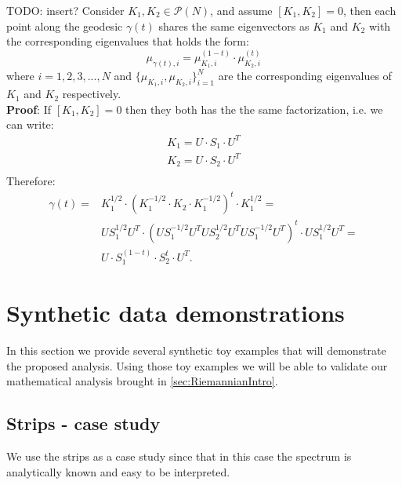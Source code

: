 \documentclass[]{article}
\theoremstyle{definition}
\begin{document}
	
	TODO: insert?
	Consider $K_1,K_2 \in \mathcal{P}(N)$, and assume $[K_1,K_2]=0$, then each point along the geodesic $\gamma(t)$ shares the same eigenvectors as $K_1$ and $K_2$ with the corresponding eigenvalues that holds the form: 
	\begin{equation}
	\mu_{\gamma(t),i} = \mu_{K_1,i}^{(1-t)} \cdot \mu_{K_2,i}^{(t)} 
	\label{eq:CommonEigenVals2}
	\end{equation}
	where $i=1,2,3,...,N$ and $ \{ \mu_{K_1,i}, \mu_{K_2,i} \}_{i=1}^N$ are the corresponding eigenvalues of $K_1$ and $K_2$ respectively.\\
	\textbf{Proof}:
	If $[K_1,K_2]=0$ then they both has the the same factorization, i.e. we can write:
	\begin{eqnarray*}
		K_1 = U\cdot S_1 \cdot U^T \\ 
		K_2 = U\cdot S_2 \cdot U^T \\ 
	\end{eqnarray*}
	Therefore:
	\begin{equation}
	\begin{aligned}
	\gamma(t)= & K_1^{1/2}\cdot( K_1^{-1/2} \cdot K_2 \cdot K_1^{-1/2})^t \cdot K_1^{1/2} =\\
	& U S_1^{1/2}  U^T \cdot(U S_1^{-1/2}  U^T  U S_2^{1/2}  U^T  U S_1^{-1/2}  U^T )^t \cdot U S_1^{1/2}  U^T = \\
	& U\cdot S_1^{(1-t)} \cdot S_2^{t}\cdot U^T.
	\end{aligned}
	\end{equation}
	
	
	
	
	\section{Synthetic data demonstrations}
	\label{sec:SynthData}
	In this section we provide several synthetic toy examples that will demonstrate the proposed analysis. Using those toy examples we will be able to validate our mathematical analysis brought in \ref{sec:RiemannianIntro}.
	
	\subsection{Strips - case study}
	\label{subsec:Strips}
	We use the strips as a case study since that in this case the spectrum is analytically known and easy to be interpreted.
	
\end{document}
